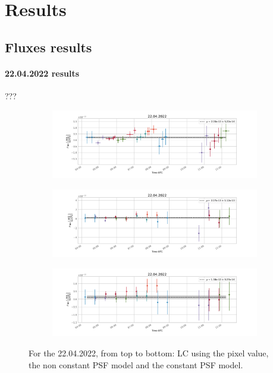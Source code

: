 \section{Results}
    \subsection{Fluxes results}

    \paragraph{22.04.2022 results}
    ???

        \begin{figure}[H]
        \centering
        \begin{subfigure}{\textwidth}
            \includegraphics[width=\textwidth]{report/Figures/results/lc_2204.png}
        \end{subfigure}%
        \hspace{1em}
        \begin{subfigure}{\textwidth}
            \centering
            \includegraphics[width=\textwidth]{report/Figures/results/lc_2204_psf_notconst.png}
        \end{subfigure}
        \hspace{1em}
        \begin{subfigure}{\textwidth}
            \centering
            \includegraphics[width=\textwidth]{report/Figures/results/lc_2204_psf_const.png}
        \end{subfigure}
        \caption{For the 22.04.2022, from top to bottom: LC using the pixel value, the non constant PSF model and the constant PSF model.}
        \label{22_lc}
        \end{figure}
        

